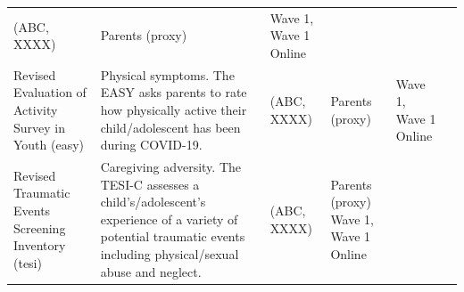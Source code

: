 \documentclass[]{book}
\begin{document}
\begin{longtable}[]{@{}llllll@{}}
\begin{minipage}[t]{0.15\columnwidth}
(ABC, XXXX)\strut
\end{minipage} & \begin{minipage}[t]{0.16\columnwidth}\raggedright
Parents (proxy)\strut
\end{minipage} & \begin{minipage}[t]{0.06\columnwidth}\raggedright
Wave 1, Wave 1 Online\strut
\end{minipage} & \begin{minipage}[t]{0.10\columnwidth}\raggedright
\strut
\end{minipage}\tabularnewline
\begin{minipage}[t]{0.18\columnwidth}\raggedright
Revised Evaluation of Activity Survey in Youth (easy)\strut
\end{minipage} & \begin{minipage}[t]{0.18\columnwidth}\raggedright
Physical symptoms. The EASY asks parents to rate how physically active their child/adolescent has been during COVID-19.\strut
\end{minipage} & \begin{minipage}[t]{0.15\columnwidth}\raggedright
(ABC, XXXX)\strut
\end{minipage} & \begin{minipage}[t]{0.16\columnwidth}\raggedright
Parents (proxy)\strut
\end{minipage} & \begin{minipage}[t]{0.06\columnwidth}\raggedright
Wave 1, Wave 1 Online\strut
\end{minipage} & \begin{minipage}[t]{0.10\columnwidth}\raggedright
\strut
\end{minipage}\tabularnewline
\begin{minipage}[t]{0.18\columnwidth}\raggedright
Revised Traumatic Events Screening Inventory (tesi)\strut
\end{minipage} & \begin{minipage}[t]{0.18\columnwidth}\raggedright
Caregiving adversity. The TESI-C assesses a child's/adolescent's experience of a variety of potential traumatic events including physical/sexual abuse and neglect.\strut
\end{minipage} & \begin{minipage}[t]{0.15\columnwidth}\raggedright
(ABC, XXXX)\strut
\end{minipage} & \begin{minipage}[t]{0.16\columnwidth}\raggedright
Parents (proxy) Wave 1, Wave 1 Online\strut
\end{minipage} & \begin{minipage}[t]{0.06\columnwidth}\raggedright

\end{minipage}
\end{longtable}
\end{document}
